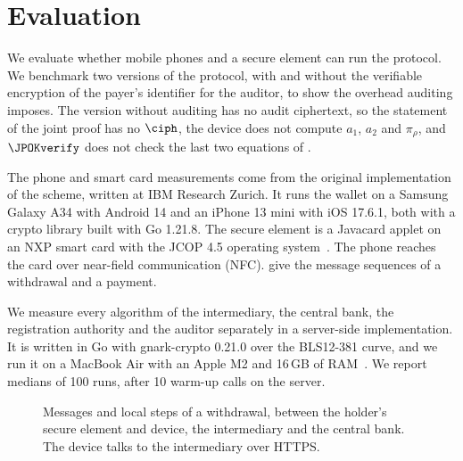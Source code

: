 \section{Evaluation}\label{sec:offline-evaluation}
\suppressfloats[t]

We evaluate whether mobile phones and a secure element can run the protocol. We
benchmark two versions of
the protocol, with and without the verifiable encryption of the payer's
identifier for the auditor, to show the overhead auditing imposes. The version
without auditing has no audit ciphertext, so the statement of the joint proof
has no $\ciph$, the device does not compute $a_1$, $a_2$ and $\pi_\rho$, and
$\JPOKverify$ does not check the last two equations of
.

The phone and smart card measurements come from the original implementation of
the scheme, written at IBM Research Zurich. It runs the wallet on a Samsung Galaxy A34
with Android 14 and an iPhone 13 mini with iOS 17.6.1, both with a crypto
library built with Go 1.21.8.
The secure element is a Javacard applet on an NXP smart card with the JCOP 4.5
operating system~\cite{javacard}. The phone reaches the card over near-field
communication (NFC).
 give the message sequences
of a withdrawal and a payment.

We measure every algorithm of the intermediary, the central bank, the
registration authority and the auditor separately in a server-side
implementation. It is written in Go with gnark-crypto 0.21.0 over the BLS12-381
curve, and we run it on a MacBook Air with an Apple M2 and 16\,GB of
RAM~\cite{gnark-crypto}. We report medians of 100 runs, after 10 warm-up
calls on the server.

\begin{figure}[htbp] \centering \small
{}
\caption[Offline payments: withdrawal]{Messages and local steps of a
withdrawal, between the holder's secure element and device, the intermediary
and the central bank. The device talks to the intermediary over HTTPS.}
\label{fig:offline-withdraw-seq} \end{figure}


